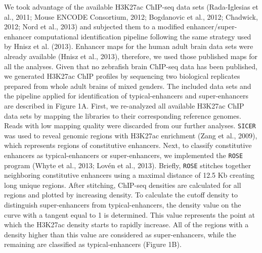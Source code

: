		We took advantage of the available H3K27ac ChIP-seq data sets (Rada-Iglesias et al., 2011; Mouse ENCODE Consortium, 2012; Bogdanovic et al., 2012; Chadwick, 2012; Nord et al., 2013) and subjected them to a modified enhancer/super-enhancer computational identification pipeline following the same strategy used by Hnisz et al. (2013). Enhancer maps for the human adult brain data sets were already available (Hnisz et al., 2013), therefore, we used those published maps for all the analyses. Given that no zebrafish brain ChIP-seq data has been published, we generated H3K27ac ChIP profiles by sequencing two biological replicates prepared from whole adult brains of mixed genders. The included data sets and the pipeline applied for identification of typical-enhancers and super-enhancers are described in Figure 1A. First, we re-analyzed all available H3K27ac ChIP data sets by mapping the libraries to their corresponding reference genomes. Reads with low mapping quality were discarded from our further analyses. \texttt{SICER} was used to reveal genomic regions with H3K27ac enrichment (Zang et al., 2009), which represents regions of constitutive enhancers. Next, to classify constitutive enhancers as typical-enhancers or super-enhancers, we implemented the \texttt{ROSE} program (Whyte et al., 2013; Lov\'en et al., 2013). Briefly, \texttt{ROSE} stitches together neighboring constitutive enhancers using a maximal distance of 12.5 Kb creating long unique regions. After stitching, ChIP-seq densities are calculated for all regions and plotted by increasing density. To calculate the cutoff density to distinguish super-enhancers from typical-enhancers, the density value on the curve with a tangent equal to 1 is determined. This value represents the point at which the H3K27ac density starts to rapidly increase. All of the regions with a density higher than this value are considered as super-enhancers, while the remaining are classified as typical-enhancers (Figure 1B).\\

